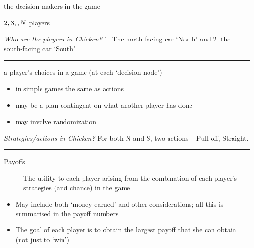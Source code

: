 \documentclass[]{article}
\providecommand{\tightlist}{%
  \setlength{\itemsep}{0pt}\setlength{\parskip}{0pt}}
\begin{document}
\begin{description}
\tightlist
\item[Players]
the decision makers in the game
\end{description}

\bigskip

\(2, 3, \bigskip, N\) players

\bigskip

\emph{Who are the players in Chicken?} 1. The north-facing car `North' and 2. the south-facing car `South'

\begin{center}\rule{0.5\linewidth}{\linethickness}\end{center}

\begin{description}
\tightlist
\item[Strategies]
a player's choices in a game (at each `decision node')
\end{description}

\begin{itemize}
\tightlist
\item
  in simple games the same as actions
\item
  may be a plan contingent on what another player has done
\item
  may involve randomization
\end{itemize}

\bigskip

\emph{Strategies/actions in Chicken?} For both N and S, two actions -- Pull-off, Straight.

\begin{center}\rule{0.5\linewidth}{\linethickness}\end{center}

\begin{description}
\item[Payoffs]
The utility to each player arising from the combination of each player's strategies (and chance) in the game
\end{description}

\begin{itemize}
\item
  May include both `money earned' and other considerations; all this is summarised in the payoff numbers
\item
  The goal of each player is to obtain the largest payoff that she can obtain (not just to `win')
\end{itemize}
\end{document}
